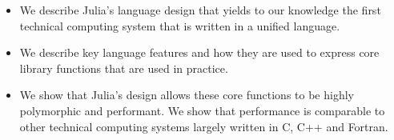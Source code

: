 \begin{itemize}
\item We describe Julia's language design that yields to our knowledge the first technical computing system that is written in a unified language.
\item We describe key language features and how they are used to express core library functions that are used in practice.
\item We show that Julia's design allows these core functions to be highly polymorphic and performant.
\itme We show that performance is comparable to other technical computing systems largely written in C, C++ and Fortran.
\end{itemize}

%



